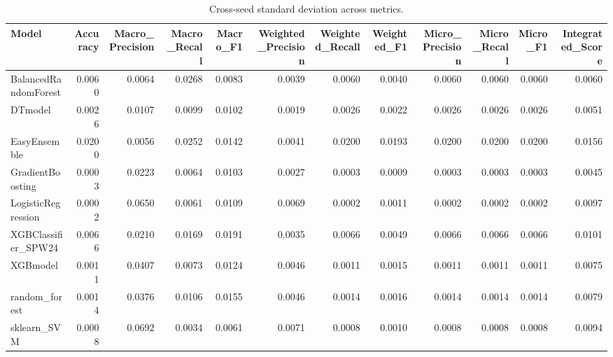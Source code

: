 \begin{table}[t]
\centering
\begin{tabular}{lrrrrrrrrrrr}
\toprule
Model & Accuracy & Macro_Precision & Macro_Recall & Macro_F1 & Weighted_Precision & Weighted_Recall & Weighted_F1 & Micro_Precision & Micro_Recall & Micro_F1 & Integrated_Score \\
\midrule
BalancedRandomForest & 0.0060 & 0.0064 & 0.0268 & 0.0083 & 0.0039 & 0.0060 & 0.0040 & 0.0060 & 0.0060 & 0.0060 & 0.0060 \\
DTmodel & 0.0026 & 0.0107 & 0.0099 & 0.0102 & 0.0019 & 0.0026 & 0.0022 & 0.0026 & 0.0026 & 0.0026 & 0.0051 \\
EasyEnsemble & 0.0200 & 0.0056 & 0.0252 & 0.0142 & 0.0041 & 0.0200 & 0.0193 & 0.0200 & 0.0200 & 0.0200 & 0.0156 \\
GradientBoosting & 0.0003 & 0.0223 & 0.0064 & 0.0103 & 0.0027 & 0.0003 & 0.0009 & 0.0003 & 0.0003 & 0.0003 & 0.0045 \\
LogisticRegression & 0.0002 & 0.0650 & 0.0061 & 0.0109 & 0.0069 & 0.0002 & 0.0011 & 0.0002 & 0.0002 & 0.0002 & 0.0097 \\
XGBClassifier_SPW24 & 0.0066 & 0.0210 & 0.0169 & 0.0191 & 0.0035 & 0.0066 & 0.0049 & 0.0066 & 0.0066 & 0.0066 & 0.0101 \\
XGBmodel & 0.0011 & 0.0407 & 0.0073 & 0.0124 & 0.0046 & 0.0011 & 0.0015 & 0.0011 & 0.0011 & 0.0011 & 0.0075 \\
random_forest & 0.0014 & 0.0376 & 0.0106 & 0.0155 & 0.0046 & 0.0014 & 0.0016 & 0.0014 & 0.0014 & 0.0014 & 0.0079 \\
sklearn_SVM & 0.0008 & 0.0692 & 0.0034 & 0.0061 & 0.0071 & 0.0008 & 0.0010 & 0.0008 & 0.0008 & 0.0008 & 0.0094 \\
\bottomrule
\end{tabular}
\caption{Cross-seed standard deviation across metrics.}
\label{tab:cross_seed_std}
\end{table}